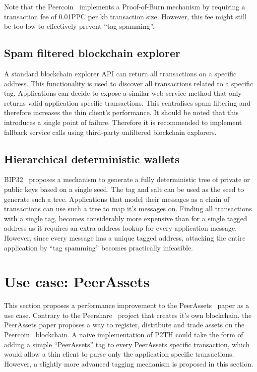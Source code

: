 \documentclass[a4paper,10pt]{article}
\begin{document}
Note that the Peercoin~\cite{King12} implements a Proof-of-Burn mechanism by requiring a transaction fee of 0.01PPC per kb transaction size.
However, this fee might still be too low to effectively prevent ``tag spamming''.

\subsection{Spam filtered blockchain explorer}
A standard blockchain explorer API can return all transactions on a specific address.
This functionality is used to discover all transactions related to a specific tag.
Applications can decide to expose a similar web service method that only returns valid application specific transactions.
This centralises spam filtering and therefore increases the thin client's performance.
It should be noted that this introduces a single point of failure.
Therefore it is recommended to implement fallback service calls using third-party unfiltered blockchain explorers.

\subsection{Hierarchical deterministic wallets}
BIP32~\cite{Wui12} proposes a mechanism to generate a fully deterministic tree of private or public keys based on a single seed.
The tag and salt can be used as the seed to generate such a tree.
Applications that model their messages as a chain of transactions can use such a tree to map it's messages on.
Finding all transactions with a single tag, becomes considerably more expensive than for a single tagged address as it requires an extra address lookup for every application message.
However, since every message has a unique tagged address, attacking the entire application by ``tag spamming'' becomes practically infeasible.


\section{Use case: PeerAssets}
This section proposes a performance improvement to the PeerAssets~\cite{Pchem} paper as a use case.
Contrary to the Peershare~\cite{Lee13} project that creates it's own blockchain, the PeerAssets paper proposes a way to register, distribute and trade assets on the Peercoin~\cite{King12} blockchain.
A naive implementation of P2TH could take the form of adding a simple ``PeerAssets'' tag to every PeerAssets specific transaction, which would allow a thin client to parse only the application specific transactions.
However, a slightly more advanced tagging mechanism is proposed in this section.
\end{document}
